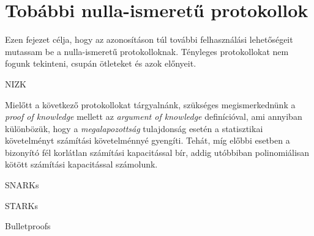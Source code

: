 \chapter{Tobábbi nulla-ismeretű protokollok}

Ezen fejezet célja, hogy az azonosításon túl további felhasználási lehetőségeit mutassam be a nulla-ismeretű protokolloknak. Tényleges protokollokat nem fogunk tekinteni, csupán ötleteket és azok előnyeit.

NIZK \cite{NIZK}

Mielőtt a következő protokollokat tárgyalnánk, szükséges megismerkednünk a \textit{proof of knowledge} mellett az \textit{argument of knowledge} definícióval, ami annyiban különbözük, hogy a \textit{megalapozottság} tulajdonság esetén a statisztikai követelményt számítási követelménnyé gyengíti. Tehát, míg előbbi esetben a bizonyító fél korlátlan számítási kapacitással bír, addig utóbbiban polinomiálisan kötött számítási kapacitással számolunk.

SNARKs \cite{SNARK}

STARKs \cite{STARK}

Bulletproofs \cite{BULLETPROOF}